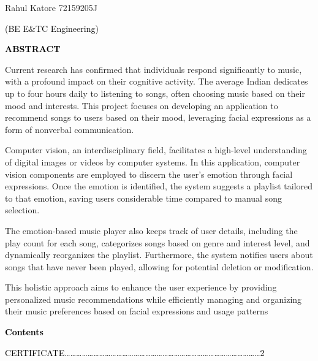 \documentclass[a4paper]{article}
\begin{document}
\bigskip


\bigskip

Rahul Katore 72159205J

\textcolor{black}{(BE E\&TC Engineering)}


\bigskip


\bigskip

\clearpage\clearpage\setcounter{page}{1}\pagestyle{Convertediii}

\bigskip

{\centering
\textbf{\textcolor{black}{ABSTRACT}}
\par}


\bigskip

Current research has confirmed that individuals respond significantly to music, with a profound impact on their
cognitive activity. The average Indian dedicates up to four hours daily to listening to songs, often choosing music
based on their mood and interests. This project focuses on developing an application to recommend songs to users based
on their mood, leveraging facial expressions as a form of nonverbal communication.

Computer vision, an interdisciplinary field, facilitates a high-level understanding of digital images or videos by
computer systems. In this application, computer vision components are employed to discern the user's emotion through
facial expressions. Once the emotion is identified, the system suggests a playlist tailored to that emotion, saving
users considerable time compared to manual song selection.

The emotion-based music player also keeps track of user details, including the play count for each song, categorizes
songs based on genre and interest level, and dynamically reorganizes the playlist. Furthermore, the system notifies
users about songs that have never been played, allowing for potential deletion or modification.

This holistic approach aims to enhance the user experience by providing personalized music recommendations while
efficiently managing and organizing their music preferences based on facial expressions and usage patterns


\bigskip


\bigskip

\clearpage\setcounter{page}{1}\pagestyle{Convertediv}
{\centering
\textbf{\textcolor{black}{Contents}}
\par}


\bigskip

\textcolor{black}{CERTIFICATE{\dots}{\dots}{\dots}{\dots}{\dots}{\dots}{\dots}{\dots}{\dots}{\dots}{\dots}{\dots}{\dots}{\dots}{\dots}{\dots}{\dots}{\dots}{\dots}{\dots}{\dots}{\dots}{\dots}{\dots}{\dots}{\dots}{\dots}{\dots}{\dots}{\dots}{\dots}{\dots}{\dots}{\dots}2}
\end{document}
